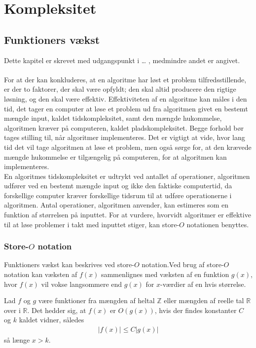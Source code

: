 \chapter{Kompleksitet}
\section{Funktioners vækst}
Dette kapitel er skrevet med udgangspunkt i … , medmindre andet er angivet. \\ \\
For at der kan konkluderes, at en algoritme har løst et problem tilfredsstillende, er der to faktorer, der skal være opfyldt; den skal altid producere den rigtige løsning, og den skal være effektiv. 
Effektiviteten af en algoritme kan måles i den tid, det tager en computer at løse et problem ud fra algoritmen givet en bestemt mængde input, kaldet tidskompleksitet, samt den mængde hukommelse, algoritmen kræver på computeren, kaldet pladskompleksitet. 
Begge forhold bør tages stilling til, når algoritmer implementeres.
Det er vigtigt at vide, hvor lang tid det vil tage algoritmen at løse et problem, men også sørge for, at den krævede mængde hukommelse er tilgængelig på computeren, for at algoritmen kan implementeres. \\ 
En algoritmes tidskompleksitet er udtrykt ved antallet af operationer, algoritmen udfører ved en bestemt mængde input og ikke den faktiske computertid, da forskellige computer kræver forskellige tidsrum til at udføre operationerne i algoritmen. 
Antal operationer, algoritmen anvender, kan estimeres som en funktion af størrelsen på inputtet. 
For at vurdere, hvorvidt algoritmer er effektive til at løse problemer i takt med inputtet stiger, kan store-$O$ notationen benyttes.

\subsection{Store-$O$ notation} \label{eq_o}
Funktioners vækst kan beskrives ved store-$O$ notation.Ved brug af store-$O$ notation kan væksten af $f(x)$ sammenlignes med væksten af en funktion $g(x)$, hvor $f(x)$ vil vokse langsommere end $g(x)$ for $x$-værdier af en hvis størrelse. \\
\begin{defn}
	Lad $f$ og $g$ være funktioner fra mængden af heltal $\mathbb{Z}$ eller mængden af reelle tal $\mathbb{R}$ over i $\mathbb{R}$. 
	Det hedder sig, at $f(x)$ er $O(g(x))$, hvis der findes konstanter $C$ og $k$ kaldet vidner, således 
\begin{align*}
|f(x)| \leq C |g(x)|
\end{align*}
så længe $x>k$.
\end{defn}

